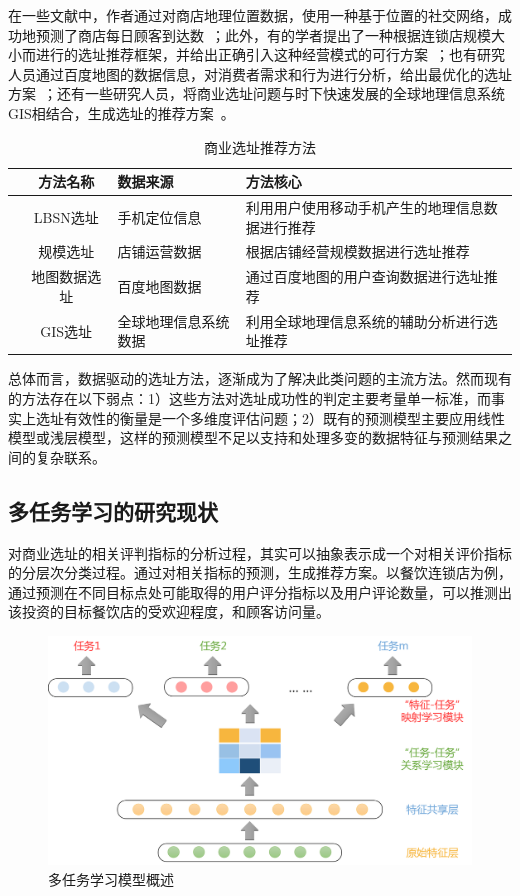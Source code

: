 \documentclass[UTF8]{llncs}
\begin{document}
在一些文献中，作者通过对商店地理位置数据，使用一种基于位置的社交网络，成功地预测了商店每日顾客到达数~\cite{LBSN}；此外，有的学者提出了一种根据连锁店规模大小而进行的选址推荐框架，并给出正确引入这种经营模式的可行方案~\cite{chainDev}；也有研究人员通过百度地图的数据信息，对消费者需求和行为进行分析，给出最优化的选址方案~\cite{DengYue}；还有一些研究人员，将商业选址问题与时下快速发展的全球地理信息系统GIS相结合，生成选址的推荐方案~\cite{HeJiexin}。

\begin{table}[!hpt]
	\centering
	\caption{商业选址推荐方法}
	\label{tb:reco-method}
	\begin{tabular}{ccll}
		\hline
		& \textbf{方法名称}  & \textbf{数据来源} & \textbf{方法核心}  \\ \hline
		& LBSN选址 & 手机定位信息  & 利用用户使用移动手机产生的地理信息数据进行推荐       \\ %
		& 规模选址   & 店铺运营数据     & 根据店铺经营规模数据进行选址推荐                                \\ %
		& 地图数据选址  & 百度地图数据  & 通过百度地图的用户查询数据进行选址推荐                                \\ %
		& GIS选址  & 全球地理信息系统数据 & 利用全球地理信息系统的辅助分析进行选址推荐                  \\ \hline
	\end{tabular}
\end{table}

总体而言，数据驱动的选址方法，逐渐成为了解决此类问题的主流方法。然而现有的方法存在以下弱点：1）这些方法对选址成功性的判定主要考量单一标准，而事实上选址有效性的衡量是一个多维度评估问题；2）既有的预测模型主要应用线性模型或浅层模型，这样的预测模型不足以支持和处理多变的数据特征与预测结果之间的复杂联系。
\subsection{多任务学习的研究现状}
对商业选址的相关评判指标的分析过程，其实可以抽象表示成一个对相关评价指标的分层次分类过程。通过对相关指标的预测，生成推荐方案。以餐饮连锁店为例，通过预测在不同目标点处可能取得的用户评分指标以及用户评论数量，可以推测出该投资的目标餐饮店的受欢迎程度，和顾客访问量。

\begin{figure}
	\centering
	\includegraphics[width=0.8\columnwidth]{figures/multiLearn.png}
	\caption{多任务学习模型概述}
	\label{MTLmodel}
\end{figure}
\end{document}
